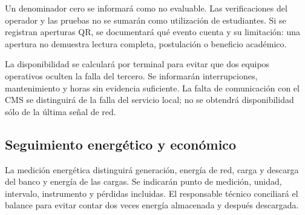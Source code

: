 
Un denominador cero se informará como no evaluable. Las verificaciones del operador y las pruebas no se sumarán como utilización de estudiantes. Si se registran aperturas QR, se documentará qué evento cuenta y su limitación: una apertura no demuestra lectura completa, postulación o beneficio académico.

La disponibilidad se calculará por terminal para evitar que dos equipos operativos oculten la falla del tercero. Se informarán interrupciones, mantenimiento y horas sin evidencia suficiente. La falta de comunicación con el CMS se distinguirá de la falla del servicio local; no se obtendrá disponibilidad sólo de la última señal de red.

\subsection{Seguimiento energético y económico}
La medición energética distinguirá generación, energía de red, carga y descarga del banco y energía de las cargas. Se indicarán punto de medición, unidad, intervalo, instrumento y pérdidas incluidas. El responsable técnico conciliará el balance para evitar contar dos veces energía almacenada y después descargada.

